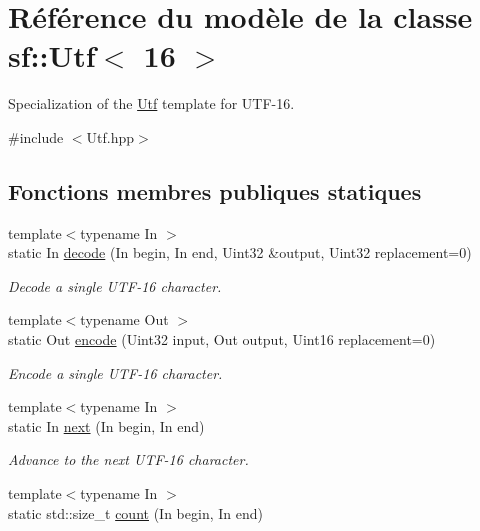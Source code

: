 \hypertarget{classsf_1_1Utf_3_0116_01_4}{}\section{Référence du modèle de la classe sf\+:\+:Utf$<$ 16 $>$}
\label{classsf_1_1Utf_3_0116_01_4}


Specialization of the \hyperlink{classsf_1_1Utf}{Utf} template for U\+T\+F-\/16.  




{\ttfamily \#include $<$Utf.\+hpp$>$}

\subsection*{Fonctions membres publiques statiques}
\begin{DoxyCompactItemize}
\item 
{\footnotesize template$<$typename In $>$ }\\static In \hyperlink{classsf_1_1Utf_3_0116_01_4_a17be6fc08e51182e7ac8bf9269dfae37}{decode} (In begin, In end, Uint32 \&output, Uint32 replacement=0)
\begin{DoxyCompactList}\small\item\em Decode a single U\+T\+F-\/16 character. \end{DoxyCompactList}\item 
{\footnotesize template$<$typename Out $>$ }\\static Out \hyperlink{classsf_1_1Utf_3_0116_01_4_a516090c84ceec2cfde0a13b6148363bb}{encode} (Uint32 input, Out output, Uint16 replacement=0)
\begin{DoxyCompactList}\small\item\em Encode a single U\+T\+F-\/16 character. \end{DoxyCompactList}\item 
{\footnotesize template$<$typename In $>$ }\\static In \hyperlink{classsf_1_1Utf_3_0116_01_4_ab899108d77ce088eb001588e84d91525}{next} (In begin, In end)
\begin{DoxyCompactList}\small\item\em Advance to the next U\+T\+F-\/16 character. \end{DoxyCompactList}\item 
{\footnotesize template$<$typename In $>$ }\\static std\+::size\+\_\+t \hyperlink{classsf_1_1Utf_3_0116_01_4_a6df8d9be8211ffe1095b3b82eac83f6f}{count} (In begin, In end)

\end{DoxyCompactItemize}
